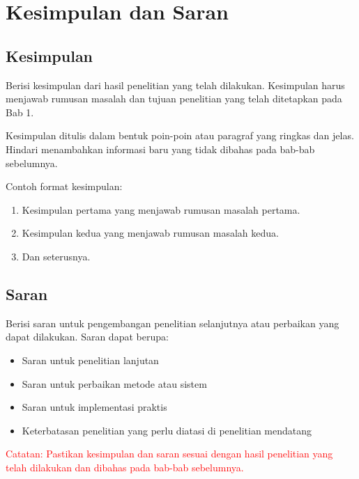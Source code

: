\chapter{Kesimpulan dan Saran}

\section{Kesimpulan}

Berisi kesimpulan dari hasil penelitian yang telah dilakukan. Kesimpulan harus menjawab rumusan masalah dan tujuan penelitian yang telah ditetapkan pada Bab 1.

Kesimpulan ditulis dalam bentuk poin-poin atau paragraf yang ringkas dan jelas. Hindari menambahkan informasi baru yang tidak dibahas pada bab-bab sebelumnya.

Contoh format kesimpulan:
\begin{enumerate}
    \item Kesimpulan pertama yang menjawab rumusan masalah pertama.
    \item Kesimpulan kedua yang menjawab rumusan masalah kedua.
    \item Dan seterusnya.
\end{enumerate}

\section{Saran}

Berisi saran untuk pengembangan penelitian selanjutnya atau perbaikan yang dapat dilakukan. Saran dapat berupa:
\begin{itemize}
    \item Saran untuk penelitian lanjutan
    \item Saran untuk perbaikan metode atau sistem
    \item Saran untuk implementasi praktis
    \item Keterbatasan penelitian yang perlu diatasi di penelitian mendatang
\end{itemize}

\textcolor{red}{Catatan: Pastikan kesimpulan dan saran sesuai dengan hasil penelitian yang telah dilakukan dan dibahas pada bab-bab sebelumnya.}
